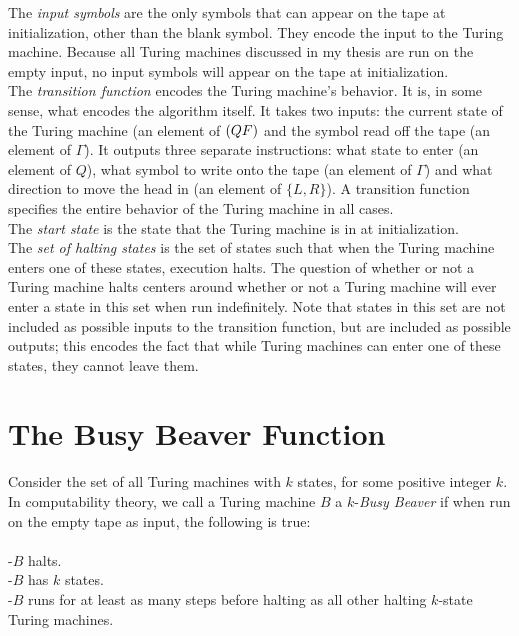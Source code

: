 \documentclass{report}
\begin{document}
The \emph{input symbols} are the only symbols that can appear on the tape at initialization, other than the blank symbol. They encode the input to the Turing machine. Because all Turing machines discussed in my thesis are run on the empty input, no input symbols will appear on the tape at initialization. \\

The \emph{transition function} encodes the Turing machine's behavior. It is, in some sense, what encodes the algorithm itself. It takes two inputs: the current state of the Turing machine (an element of $(Q \\ F)$ and the symbol read off the tape (an element of $\Gamma$). It outputs three separate instructions: what state to enter (an element of $Q$), what symbol to write onto the tape (an element of $\Gamma$) and what direction to move the head in (an element of $\{L, R\}$). A transition function specifies the entire behavior of the Turing machine in all cases. \\

The \emph{start state} is the state that the Turing machine is in at initialization. \\

The \emph{set of halting states} is the set of states such that when the Turing machine enters one of these states, execution halts. The question of whether or not a Turing machine halts centers around whether or not a Turing machine will ever enter a state in this set when run indefinitely. Note that states in this set are not included as possible inputs to the transition function, but are included as possible outputs; this encodes the fact that while Turing machines can enter one of these states, they cannot leave them. 

\section{The Busy Beaver Function}

Consider the set of all Turing machines with $k$ states, for some positive integer $k$. In computability theory, we call a Turing machine $B$ a $k$-\emph{Busy Beaver} if when run on the empty tape as input, the following is true: \\ \\
-$B$ halts. \\
-$B$ has $k$ states. \\
-$B$ runs for at least as many steps before halting as all other halting $k$-state Turing machines. \\
\end{document}
